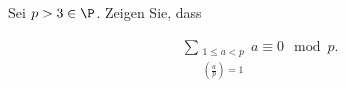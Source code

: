 
\begin{exercise}

Sei $p > 3 \in \P$. Zeigen Sie, dass

\begin{align*}
    \sum_{\substack{1 \leq a < p \\ \left(\frac{a}{p}\right)=1}} a \equiv 0 \mod{p}.
\end{align*}

\end{exercise}


\begin{solution}

\phantom{}

\end{solution}

